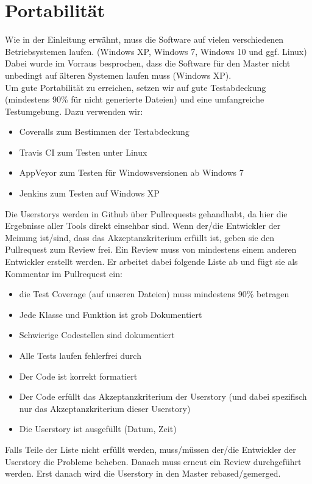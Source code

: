 \documentclass[accentcolor=tud9c,12pt,paper=a4]{tudreport}
\begin{document}
		\section{Portabilität}
		Wie in der Einleitung erwähnt, muss die Software auf vielen verschiedenen 
		Betriebsystemen laufen. (Windows XP, Windows 7, Windows 10 und ggf. Linux)
		Dabei wurde im Vorraus besprochen, dass die Software für den Master nicht 
		unbedingt auf älteren Systemen laufen muss (Windows XP).
		\\[5pt]
		Um gute Portabilität zu erreichen, setzen wir auf gute Testabdeckung 
		(mindestens 90\% für nicht generierte Dateien) und eine umfangreiche 
		Testumgebung. Dazu verwenden wir:
		\begin{itemize}	
			\item Coveralls zum Bestimmen der Testabdeckung
			\item Travis CI zum Testen unter Linux
			\item AppVeyor zum Testen für Windowsversionen ab Windows 7
			\item Jenkins zum Testen auf Windows XP
		\end{itemize}
		Die Userstorys werden in Github über Pullrequests gehandhabt, da hier die 
		Ergebnisse aller Tools direkt einsehbar sind. Wenn der/die Entwickler der Meinung 
		ist/sind, dass das Akzeptanzkriterium erfüllt ist, geben 
		sie den Pullrequest zum Review frei. Ein Review muss von mindestens einem anderen 
		Entwickler erstellt werden. Er arbeitet dabei folgende Liste ab und fügt sie als 
		Kommentar im Pullrequest ein:
		\begin{itemize}	
			\item die Test Coverage (auf unseren Dateien) muss mindestens 90\% betragen
			\item Jede Klasse und Funktion ist grob Dokumentiert
			\item Schwierige Codestellen sind dokumentiert
			\item Alle Tests laufen fehlerfrei durch
			\item Der Code ist korrekt formatiert
			\item Der Code erfüllt das Akzeptanzkriterium der Userstory (und dabei 
			spezifisch nur das Akzeptanzkriterium dieser Userstory)
			\item Die Userstory ist ausgefüllt (Datum, Zeit)
		\end{itemize}
		Falls Teile der Liste nicht erfüllt werden, muss/müssen der/die Entwickler 
		der Userstory die Probleme beheben. Danach muss erneut ein Review 
		durchgeführt werden. Erst danach wird die Userstory in den Master rebased/gemerged.
				
\end{document}
